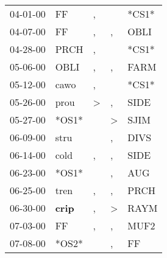 \begin{supertabular}{p{0.07\textwidth}p{0.06\textwidth}p{0.02\textwidth}p{0.02\textwidth}p{0.06\textwidth}}
          04-01-00\textsuperscript{} &             FF\textsuperscript{} &                , &                  &                            *CS1* \\
          04-07-00\textsuperscript{} &             FF\textsuperscript{} &                , &                , &           OBLI\textsuperscript{} \\
          04-28-00\textsuperscript{} &           PRCH\textsuperscript{} &                , &                  &                            *CS1* \\
          05-06-00\textsuperscript{} &           OBLI\textsuperscript{} &                , &                , &           FARM\textsuperscript{} \\
          05-12-00\textsuperscript{} &           cawo\textsuperscript{} &                , &                  &                            *CS1* \\
          05-26-00\textsuperscript{} &           prou\textsuperscript{} &     \textgreater &                , &           SIDE\textsuperscript{} \\
          05-27-00\textsuperscript{} &                            *OS1* &                  &     \textgreater &           SJIM\textsuperscript{} \\
          06-09-00\textsuperscript{} &           stru\textsuperscript{} &                  &                , &           DIVS\textsuperscript{} \\
          06-14-00\textsuperscript{} &           cold\textsuperscript{} &                , &                , &           SIDE\textsuperscript{} \\
          06-23-00\textsuperscript{} &                            *OS1* &                  &                , &            AUG\textsuperscript{} \\
          06-25-00\textsuperscript{} &           tren\textsuperscript{} &                , &                , &           PRCH\textsuperscript{} \\
          06-30-00\textsuperscript{} &  \textbf{crip\textsuperscript{}} &                , &     \textgreater &           RAYM\textsuperscript{} \\
          07-03-00\textsuperscript{} &             FF\textsuperscript{} &                , &                , &           MUF2\textsuperscript{} \\
          07-08-00\textsuperscript{} &                            *OS2* &                  &                , &             FF\textsuperscript{} \\

\end{supertabular}
